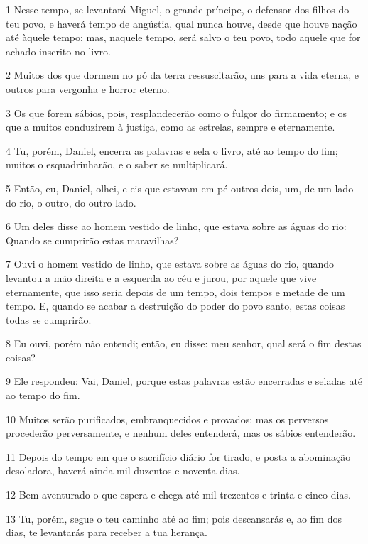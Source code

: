 \par 1 Nesse tempo, se levantará Miguel, o grande príncipe, o defensor dos filhos do teu povo, e haverá tempo de angústia, qual nunca houve, desde que houve nação até àquele tempo; mas, naquele tempo, será salvo o teu povo, todo aquele que for achado inscrito no livro.
\par 2 Muitos dos que dormem no pó da terra ressuscitarão, uns para a vida eterna, e outros para vergonha e horror eterno.
\par 3 Os que forem sábios, pois, resplandecerão como o fulgor do firmamento; e os que a muitos conduzirem à justiça, como as estrelas, sempre e eternamente.
\par 4 Tu, porém, Daniel, encerra as palavras e sela o livro, até ao tempo do fim; muitos o esquadrinharão, e o saber se multiplicará.
\par 5 Então, eu, Daniel, olhei, e eis que estavam em pé outros dois, um, de um lado do rio, o outro, do outro lado.
\par 6 Um deles disse ao homem vestido de linho, que estava sobre as águas do rio: Quando se cumprirão estas maravilhas?
\par 7 Ouvi o homem vestido de linho, que estava sobre as águas do rio, quando levantou a mão direita e a esquerda ao céu e jurou, por aquele que vive eternamente, que isso seria depois de um tempo, dois tempos e metade de um tempo. E, quando se acabar a destruição do poder do povo santo, estas coisas todas se cumprirão.
\par 8 Eu ouvi, porém não entendi; então, eu disse: meu senhor, qual será o fim destas coisas?
\par 9 Ele respondeu: Vai, Daniel, porque estas palavras estão encerradas e seladas até ao tempo do fim.
\par 10 Muitos serão purificados, embranquecidos e provados; mas os perversos procederão perversamente, e nenhum deles entenderá, mas os sábios entenderão.
\par 11 Depois do tempo em que o sacrifício diário for tirado, e posta a abominação desoladora, haverá ainda mil duzentos e noventa dias.
\par 12 Bem-aventurado o que espera e chega até mil trezentos e trinta e cinco dias.
\par 13 Tu, porém, segue o teu caminho até ao fim; pois descansarás e, ao fim dos dias, te levantarás para receber a tua herança.



